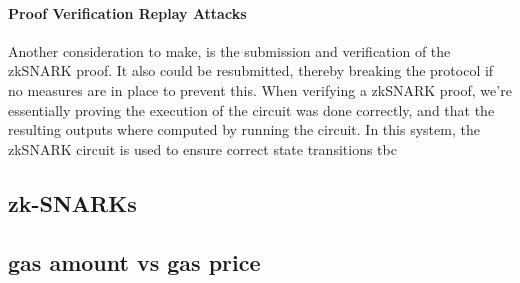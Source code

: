 \documentclass[../../thesis.tex]{subfiles}
\begin{document}
\paragraph{Proof Verification Replay Attacks}
Another consideration to make, is the submission and verification of the zkSNARK proof. It also could be resubmitted, thereby breaking the protocol if no measures are in place to prevent this. When verifying a zkSNARK proof, we're essentially proving the execution of the circuit was done correctly, and that the resulting outputs where computed by running the circuit. In this system, the zkSNARK circuit is used to ensure correct state transitions tbc


\subsection{zk-SNARKs}

\subsection{gas amount vs gas price}


\end{document}
